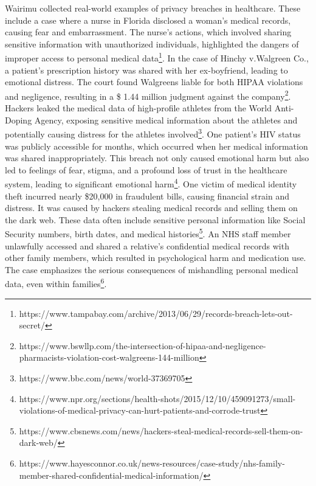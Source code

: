 \documentclass{article}
\begin{document}
Wairimu \cite{2022_Wairimu} collected real-world examples of privacy breaches in healthcare.
These include a case where a nurse in Florida disclosed a woman’s medical records, causing fear and embarrassment. The nurse’s actions, which involved sharing sensitive information with unauthorized individuals, highlighted the dangers of improper access to personal medical data\footnote{https://www.tampabay.com/archive/2013/06/29/records-breach-lets-out-secret/}.
In the case of Hinchy v.Walgreen Co., a patient’s prescription history was shared with her ex-boyfriend, leading to emotional distress. The court found Walgreens liable for both HIPAA violations and negligence, resulting in a \$ 1.44 million judgment against the company\footnote{https://www.bswllp.com/the-intersection-of-hipaa-and-negligence-pharmacists-violation-cost-walgreens-144-million}. 
Hackers leaked the medical data of high-profile athletes from the World Anti-Doping Agency, exposing sensitive medical information about the athletes and potentially causing distress for the athletes involved\footnote{https://www.bbc.com/news/world-37369705}. 
One patient’s HIV status was publicly accessible for months, which occurred when her medical information was shared inappropriately. This breach not only caused emotional harm but also led to feelings of fear, stigma, and a profound loss of trust in the healthcare system, leading to significant emotional harm\footnote{https://www.npr.org/sections/health-shots/2015/12/10/459091273/small-violations-of-medical-privacy-can-hurt-patients-and-corrode-trust}. 
One victim of medical identity theft incurred nearly \$20,000 in fraudulent bills, causing financial strain and distress. It was caused by hackers stealing medical records and selling them on the dark web. These data often include sensitive personal information like Social Security numbers, birth dates, and medical histories\footnote{https://www.cbsnews.com/news/hackers-steal-medical-records-sell-them-on-dark-web/}. 
An NHS staff member unlawfully accessed and shared a relative's confidential medical records with other family members, which resulted in psychological harm and medication use. 
The case emphasizes the serious consequences of mishandling personal medical data, even within families\footnote{https://www.hayesconnor.co.uk/news-resources/case-study/nhs-family-member-shared-confidential-medical-information/}. 
\end{document}
